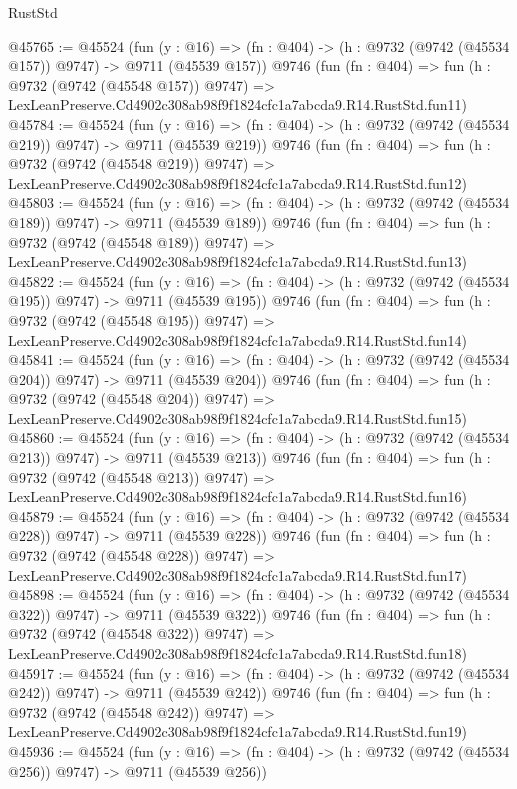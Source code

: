 \begin{lexlean}{RustStd}
\begin{coremodule}
@45765 := @45524
    (fun (y : @16) => (fn : @404) -> (h : @9732 (@9742 (@45534 @157)) @9747) -> @9711 (@45539 @157))
    @9746
    (fun (fn : @404) =>
    fun (h : @9732 (@9742 (@45548 @157)) @9747) =>
    LexLeanPreserve.Cd4902c308ab98f9f1824cfc1a7abcda9.R14.RustStd.fun11)
@45784 := @45524
    (fun (y : @16) => (fn : @404) -> (h : @9732 (@9742 (@45534 @219)) @9747) -> @9711 (@45539 @219))
    @9746
    (fun (fn : @404) =>
    fun (h : @9732 (@9742 (@45548 @219)) @9747) =>
    LexLeanPreserve.Cd4902c308ab98f9f1824cfc1a7abcda9.R14.RustStd.fun12)
@45803 := @45524
    (fun (y : @16) => (fn : @404) -> (h : @9732 (@9742 (@45534 @189)) @9747) -> @9711 (@45539 @189))
    @9746
    (fun (fn : @404) =>
    fun (h : @9732 (@9742 (@45548 @189)) @9747) =>
    LexLeanPreserve.Cd4902c308ab98f9f1824cfc1a7abcda9.R14.RustStd.fun13)
@45822 := @45524
    (fun (y : @16) => (fn : @404) -> (h : @9732 (@9742 (@45534 @195)) @9747) -> @9711 (@45539 @195))
    @9746
    (fun (fn : @404) =>
    fun (h : @9732 (@9742 (@45548 @195)) @9747) =>
    LexLeanPreserve.Cd4902c308ab98f9f1824cfc1a7abcda9.R14.RustStd.fun14)
@45841 := @45524
    (fun (y : @16) => (fn : @404) -> (h : @9732 (@9742 (@45534 @204)) @9747) -> @9711 (@45539 @204))
    @9746
    (fun (fn : @404) =>
    fun (h : @9732 (@9742 (@45548 @204)) @9747) =>
    LexLeanPreserve.Cd4902c308ab98f9f1824cfc1a7abcda9.R14.RustStd.fun15)
@45860 := @45524
    (fun (y : @16) => (fn : @404) -> (h : @9732 (@9742 (@45534 @213)) @9747) -> @9711 (@45539 @213))
    @9746
    (fun (fn : @404) =>
    fun (h : @9732 (@9742 (@45548 @213)) @9747) =>
    LexLeanPreserve.Cd4902c308ab98f9f1824cfc1a7abcda9.R14.RustStd.fun16)
@45879 := @45524
    (fun (y : @16) => (fn : @404) -> (h : @9732 (@9742 (@45534 @228)) @9747) -> @9711 (@45539 @228))
    @9746
    (fun (fn : @404) =>
    fun (h : @9732 (@9742 (@45548 @228)) @9747) =>
    LexLeanPreserve.Cd4902c308ab98f9f1824cfc1a7abcda9.R14.RustStd.fun17)
@45898 := @45524
    (fun (y : @16) => (fn : @404) -> (h : @9732 (@9742 (@45534 @322)) @9747) -> @9711 (@45539 @322))
    @9746
    (fun (fn : @404) =>
    fun (h : @9732 (@9742 (@45548 @322)) @9747) =>
    LexLeanPreserve.Cd4902c308ab98f9f1824cfc1a7abcda9.R14.RustStd.fun18)
@45917 := @45524
    (fun (y : @16) => (fn : @404) -> (h : @9732 (@9742 (@45534 @242)) @9747) -> @9711 (@45539 @242))
    @9746
    (fun (fn : @404) =>
    fun (h : @9732 (@9742 (@45548 @242)) @9747) =>
    LexLeanPreserve.Cd4902c308ab98f9f1824cfc1a7abcda9.R14.RustStd.fun19)
@45936 := @45524
    (fun (y : @16) => (fn : @404) -> (h : @9732 (@9742 (@45534 @256)) @9747) -> @9711 (@45539 @256))

\end{coremodule}
\end{lexlean}
